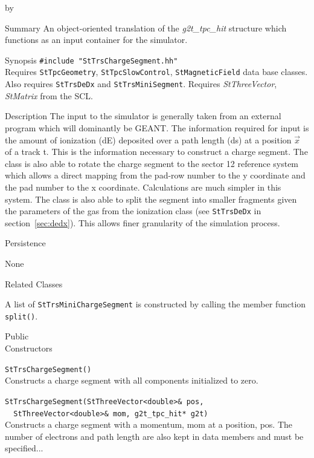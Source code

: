\documentclass[twoside]{article}
\newcommand{\comp}[1]{\texttt{#1}}%
\newcommand{\entrylabel}[1]{\mbox{\textbf{{#1}}}\hfil}%
\newenvironment{entry}
{\begin{list}{}%
    {\renewcommand{\makelabel}{\entrylabel}%
     \setlength{\labelwidth}{90pt}%
     \setlength{\leftmargin}{\labelwidth}
     \advance\leftmargin by \labelsep%
      }%
    }%
  {\end{list}}
\newcommand{\Entrylabel}[1]%
{\raisebox{0pt}[1ex][0pt]{\makebox[\labelwidth][l]%
    {\parbox[t]{\labelwidth}{\hspace{0pt}\textbf{{#1}}}}}}
\newenvironment{Entry}%
{\renewcommand{\entrylabel}{\Entrylabel}\begin{entry}}%
  {\end{entry}}
\begin{document}
\begin{Entry}
\item[Summary]
  An object-oriented translation of the {\em g2t\_tpc\_hit} structure which
  functions as an input container for the simulator.  

\item[Synopsis]
  \verb+#include "StTrsChargeSegment.hh"+\\
  Requires \comp{StTpcGeometry}, \comp{StTpcSlowControl},
  \comp{StMagneticField} data base classes.  Also
  requires \comp{StTrsDeDx} and \comp{StTrsMiniSegment}.
  Requires {\em StThreeVector}, {\em  StMatrix} from the SCL.  

\item[Description]
  The input to the simulator is generally taken from an external
  program which will dominantly be GEANT.  The information required
  for input is the amount of ionization (dE) deposited over a
  path length (ds) at a position $\vec{x}$ of a track t.  This is the
  information necessary to construct a charge segment.  The class is
  also able to rotate the charge segment to the sector 12 reference
  system which allows a direct mapping from the pad-row number to the
  y coordinate and the pad number to the x coordinate.  Calculations are
  much simpler in this system.  The class is also able to split the segment
  into smaller fragments given the parameters of the gas from the ionization
  class (see \comp{StTrsDeDx} in section~\ref{sec:dedx}).  This allows
  finer granularity of the simulation process.

\item[Persistence]

  None

\item[Related Classes]

  A list of \comp{StTrsMiniChargeSegment} is constructed by calling the
  member function \texttt{split()}.

\item[Public \\ Constructors]

  \verb+StTrsChargeSegment()+\\
   Constructs a charge segment with all components initialized to zero.

   \verb+StTrsChargeSegment(StThreeVector<double>& pos,+\\
   \verb+  StThreeVector<double>& mom, g2t_tpc_hit* g2t)+\\
   Constructs a charge segment with a momentum, mom at a position, pos.
   The number of electrons and path length are also kept in data members
   and must be specified...


\end{Entry}
\end{document}
